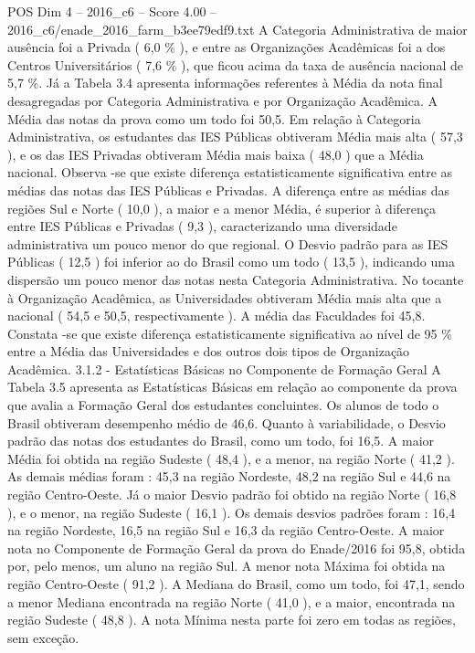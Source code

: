 \begin{textsample}{POS Dim 4 – 2016\_c6 – Score 4.00 – 2016\_c6/enade\_2016\_farm\_b3ee79edf9.txt}
A Categoria Administrativa de maior ausência foi a Privada ( 6,0 \% ), e entre as Organizações Acadêmicas foi a dos Centros Universitários ( 7,6 \% ), que ficou acima da taxa de ausência nacional de 5,7 \%.
Já a Tabela 3.4 apresenta informações referentes à Média da nota final desagregadas por Categoria Administrativa e por Organização Acadêmica.
A Média das notas da prova como um todo foi 50,5.
Em relação à Categoria Administrativa, os estudantes das IES Públicas obtiveram Média mais alta ( 57,3 ), e os das IES Privadas obtiveram Média mais baixa ( 48,0 ) que a Média nacional.
Observa -se que existe diferença estatisticamente significativa entre as médias das notas das IES Públicas e Privadas.
A diferença entre as médias das regiões Sul e Norte ( 10,0 ), a maior e a menor Média, é superior à diferença entre IES Públicas e Privadas ( 9,3 ), caracterizando uma diversidade administrativa um pouco menor do que regional.
O Desvio padrão para as IES Públicas ( 12,5 ) foi inferior ao do Brasil como um todo ( 13,5 ), indicando uma dispersão um pouco menor das notas nesta Categoria Administrativa.
No tocante à Organização Acadêmica, as Universidades obtiveram Média mais alta que a nacional ( 54,5 e 50,5, respectivamente ).
A média das Faculdades foi 45,8.
Constata -se que existe diferença estatisticamente significativa ao nível de 95 \% entre a Média das Universidades e dos outros dois tipos de Organização Acadêmica. 3.1.2 - Estatísticas Básicas no Componente de Formação Geral A Tabela 3.5 apresenta as Estatísticas Básicas em relação ao componente da prova que avalia a Formação Geral dos estudantes concluintes.
Os alunos de todo o Brasil obtiveram desempenho médio de 46,6.
Quanto à variabilidade, o Desvio padrão das notas dos estudantes do Brasil, como um todo, foi 16,5.
A maior Média foi obtida na região Sudeste ( 48,4 ), e a menor, na região Norte ( 41,2 ).
As demais médias foram : 45,3 na região Nordeste, 48,2 na região Sul e 44,6 na região Centro-Oeste.
Já o maior Desvio padrão foi obtido na região Norte ( 16,8 ), e o menor, na região Sudeste ( 16,1 ).
Os demais desvios padrões foram : 16,4 na região Nordeste, 16,5 na região Sul e 16,3 da região Centro-Oeste.
A maior nota no Componente de Formação Geral da prova do Enade/2016 foi 95,8, obtida por, pelo menos, um aluno na região Sul.
A menor nota Máxima foi obtida na região Centro-Oeste ( 91,2 ).
A Mediana do Brasil, como um todo, foi 47,1, sendo a menor Mediana encontrada na região Norte ( 41,0 ), e a maior, encontrada na região Sudeste ( 48,8 ).
A nota Mínima nesta parte foi zero em todas as regiões, sem exceção.

\end{textsample}
